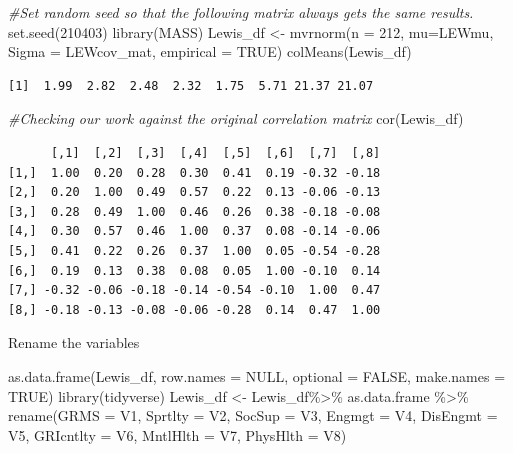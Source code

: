\documentclass[
  11pt,
]{book}
\newenvironment{Shaded}{\begin{snugshade}}{\end{snugshade}}
\newcommand{\AttributeTok}[1]{\textcolor[rgb]{0.77,0.63,0.00}{#1}}
\newcommand{\CommentTok}[1]{\textcolor[rgb]{0.56,0.35,0.01}{\textit{#1}}}
\newcommand{\ConstantTok}[1]{\textcolor[rgb]{0.00,0.00,0.00}{#1}}
\newcommand{\DecValTok}[1]{\textcolor[rgb]{0.00,0.00,0.81}{#1}}
\newcommand{\FunctionTok}[1]{\textcolor[rgb]{0.00,0.00,0.00}{#1}}
\newcommand{\NormalTok}[1]{#1}
\newcommand{\OtherTok}[1]{\textcolor[rgb]{0.56,0.35,0.01}{#1}}
\newcommand{\SpecialCharTok}[1]{\textcolor[rgb]{0.00,0.00,0.00}{#1}}
\begin{document}
\begin{Shaded}
\begin{Highlighting}[]
\CommentTok{\#Set random seed so that the following matrix always gets the same results.}
\FunctionTok{set.seed}\NormalTok{(}\DecValTok{210403}\NormalTok{)}
\FunctionTok{library}\NormalTok{(MASS)}
\NormalTok{Lewis\_df }\OtherTok{\textless{}{-}} \FunctionTok{mvrnorm}\NormalTok{(}\AttributeTok{n =} \DecValTok{212}\NormalTok{, }\AttributeTok{mu=}\NormalTok{LEWmu, }\AttributeTok{Sigma =}\NormalTok{ LEWcov\_mat, }\AttributeTok{empirical =} \ConstantTok{TRUE}\NormalTok{)}
\FunctionTok{colMeans}\NormalTok{(Lewis\_df)}
\end{Highlighting}
\end{Shaded}

\begin{verbatim}
[1]  1.99  2.82  2.48  2.32  1.75  5.71 21.37 21.07
\end{verbatim}

\begin{Shaded}
\begin{Highlighting}[]
\CommentTok{\#Checking our work against the original correlation matrix}
\FunctionTok{cor}\NormalTok{(Lewis\_df)}
\end{Highlighting}
\end{Shaded}

\begin{verbatim}
      [,1]  [,2]  [,3]  [,4]  [,5]  [,6]  [,7]  [,8]
[1,]  1.00  0.20  0.28  0.30  0.41  0.19 -0.32 -0.18
[2,]  0.20  1.00  0.49  0.57  0.22  0.13 -0.06 -0.13
[3,]  0.28  0.49  1.00  0.46  0.26  0.38 -0.18 -0.08
[4,]  0.30  0.57  0.46  1.00  0.37  0.08 -0.14 -0.06
[5,]  0.41  0.22  0.26  0.37  1.00  0.05 -0.54 -0.28
[6,]  0.19  0.13  0.38  0.08  0.05  1.00 -0.10  0.14
[7,] -0.32 -0.06 -0.18 -0.14 -0.54 -0.10  1.00  0.47
[8,] -0.18 -0.13 -0.08 -0.06 -0.28  0.14  0.47  1.00
\end{verbatim}

Rename the variables

\begin{Shaded}
\begin{Highlighting}[]
\FunctionTok{as.data.frame}\NormalTok{(Lewis\_df, }\AttributeTok{row.names =} \ConstantTok{NULL}\NormalTok{, }\AttributeTok{optional =} \ConstantTok{FALSE}\NormalTok{, }\AttributeTok{make.names =} \ConstantTok{TRUE}\NormalTok{)}
\FunctionTok{library}\NormalTok{(tidyverse)}
\NormalTok{Lewis\_df }\OtherTok{\textless{}{-}}\NormalTok{ Lewis\_df}\SpecialCharTok{\%\textgreater{}\%}
\NormalTok{  as.data.frame }\SpecialCharTok{\%\textgreater{}\%}
  \FunctionTok{rename}\NormalTok{(}\AttributeTok{GRMS =}\NormalTok{ V1, }\AttributeTok{Sprtlty =}\NormalTok{ V2, }\AttributeTok{SocSup =}\NormalTok{ V3, }\AttributeTok{Engmgt =}\NormalTok{ V4, }\AttributeTok{DisEngmt =}\NormalTok{ V5, }\AttributeTok{GRIcntlty =}\NormalTok{ V6, }\AttributeTok{MntlHlth =}\NormalTok{ V7, }\AttributeTok{PhysHlth =}\NormalTok{ V8)}
\end{Highlighting}
\end{Shaded}
\end{document}
